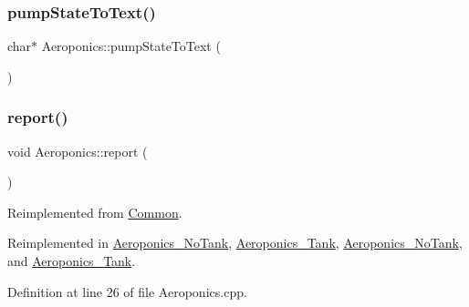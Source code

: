 \subsubsection{\texorpdfstring{pump\+State\+To\+Text()}{pumpStateToText()}\hspace{0.1cm}{\footnotesize\ttfamily [2/2]}}
{\footnotesize\ttfamily char$\ast$ Aeroponics\+::pump\+State\+To\+Text (\begin{DoxyParamCaption}{ }\end{DoxyParamCaption})\hspace{0.3cm}{\ttfamily [protected]}}

\mbox{\label{class_aeroponics_a3dbfce027ab5fa736a6007a6ae75ee4e}} 
\subsubsection{\texorpdfstring{report()}{report()}\hspace{0.1cm}{\footnotesize\ttfamily [1/2]}}
{\footnotesize\ttfamily void Aeroponics\+::report (\begin{DoxyParamCaption}{ }\end{DoxyParamCaption})\hspace{0.3cm}{\ttfamily [virtual]}}



Reimplemented from \hyperlink{class_common_a9e60e2c26a5f4d72342a59a969954636}{Common}.



Reimplemented in \hyperlink{class_aeroponics___no_tank_af2f6dfdcfd4365ed35aa83176113ff86}{Aeroponics\+\_\+\+No\+Tank}, \hyperlink{class_aeroponics___tank_a45e50ca4e5d5a605d355d65c8cd3e5cd}{Aeroponics\+\_\+\+Tank}, \hyperlink{class_aeroponics___no_tank_af2f6dfdcfd4365ed35aa83176113ff86}{Aeroponics\+\_\+\+No\+Tank}, and \hyperlink{class_aeroponics___tank_a45e50ca4e5d5a605d355d65c8cd3e5cd}{Aeroponics\+\_\+\+Tank}.



Definition at line 26 of file Aeroponics.\+cpp.

